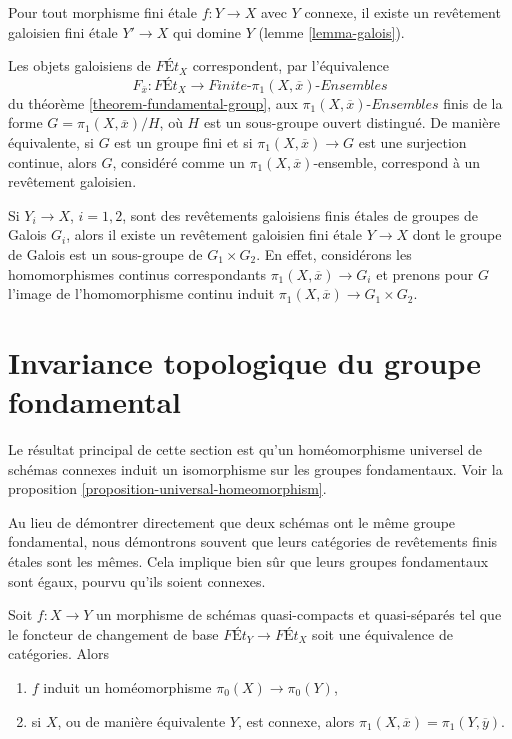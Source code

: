 \medskip\noindent
Pour tout morphisme fini étale $f : Y \to X$ avec $Y$ connexe,
il existe un revêtement galoisien fini étale $Y' \to X$ qui domine $Y$
(lemme \ref{lemma-galois}).

\medskip\noindent
Les objets galoisiens de $\textit{F\'Et}_X$ correspondent, par l'équivalence
$$
F_{\overline{x}} : \textit{F\'Et}_X \to
\textit{Finite-}\pi_1(X, \overline{x})\textit{-Ensembles}
$$
du théorème \ref{theorem-fundamental-group},
aux $\pi_1(X, \overline{x})\textit{-Ensembles}$ finis
de la forme $G = \pi_1(X, \overline{x})/H$, où $H$ est un
sous-groupe ouvert distingué. De manière équivalente, si $G$ est un groupe fini
et si $\pi_1(X, \overline{x}) \to G$ est une surjection continue,
alors $G$, considéré comme un $\pi_1(X, \overline{x})$-ensemble, correspond
à un revêtement galoisien.

\medskip\noindent
Si $Y_i \to X$, $i = 1, 2$, sont des revêtements galoisiens finis étales
de groupes de Galois $G_i$, alors il existe un revêtement galoisien
fini étale $Y \to X$ dont le groupe de Galois est un sous-groupe de
$G_1 \times G_2$. En effet, considérons les homomorphismes continus
correspondants $\pi_1(X, \overline{x}) \to G_i$ et
prenons pour $G$ l'image de l'homomorphisme continu induit
$\pi_1(X, \overline{x}) \to G_1 \times G_2$.









\section{Invariance topologique du groupe fondamental}
\label{section-topological-invariance}

\noindent
Le résultat principal de cette section est qu'un homéomorphisme universel
de schémas connexes induit un isomorphisme sur les groupes fondamentaux.
Voir la proposition \ref{proposition-universal-homeomorphism}.

\medskip\noindent
Au lieu de démontrer directement que deux schémas ont le même groupe
fondamental, nous démontrons souvent que leurs catégories de revêtements
finis étales sont les mêmes. Cela implique bien sûr que
leurs groupes fondamentaux sont égaux, pourvu qu'ils soient connexes.

\begin{lemma}
\label{lemma-what-equivalence-gives}
Soit $f : X \to Y$ un morphisme de schémas quasi-compacts et quasi-séparés
tel que le foncteur de changement de base $\textit{F\'Et}_Y \to \textit{F\'Et}_X$
soit une équivalence de catégories. Alors
\begin{enumerate}
\item $f$ induit un homéomorphisme $\pi_0(X) \to \pi_0(Y)$,
\item si $X$, ou de manière équivalente $Y$, est connexe, alors
$\pi_1(X, \overline{x}) = \pi_1(Y, \overline{y})$.
\end{enumerate}
\end{lemma}

